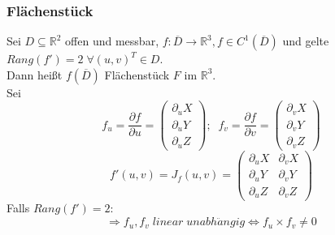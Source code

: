 \documentclass[a4paper,twocolumn,10pt]{article}
\begin{document}
\subsubsection{Flächenstück}
Sei $D\subseteq\mathbb{R}^2$ offen und messbar, $f:\overline{D}\rightarrow\mathbb{R}^3,f\in C^1(\overline{D})$ und gelte $Rang(f')=2\;\forall (u,v)^T\in D$.\\
Dann heißt $f(\overline{D})$ Flächenstück $F$ im $\mathbb{R}^3$.\\
Sei
\begin{equation*}
f_u=\frac{\partial f}{\partial u}=\begin{pmatrix}\partial_u X \\ \partial_u Y \\ \partial_u Z\end{pmatrix};\;\;f_v=\frac{\partial f}{\partial v}=\begin{pmatrix}\partial_v X \\ \partial_v Y \\ \partial_v Z\end{pmatrix}
\end{equation*}
\begin{equation*}
f'(u,v)=J_f(u,v)=\begin{pmatrix}\partial_u X & \partial_v X \\ \partial_u Y & \partial_v Y \\ \partial_u Z & \partial_v Z\end{pmatrix}
\end{equation*}
Falls $Rang(f')=2$:
\begin{equation*}
\Rightarrow f_u,f_v\;linear\;unabh\ddot{a}ngig\Leftrightarrow f_u\times f_v\neq 0
\end{equation*}
\end{document}
